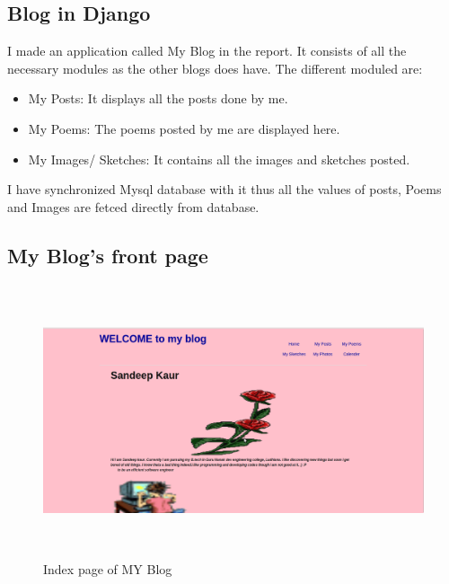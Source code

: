 
\subsection{Blog in Django}
I made an application called My Blog in the report. It consists of all the necessary modules as the other blogs does have.
The different moduled are:
\begin{itemize}
\item My Posts: It displays all the posts done by me.
\item My Poems: The poems posted by me are displayed here.
\item My Images/ Sketches: It contains all the images and sketches posted.
\end{itemize}
 
I have synchronized Mysql database with it thus all the values of posts, Poems and Images are fetced directly from database.
\subsection{My Blog's front page}
\begin{figure}[h]
\centering \includegraphics[height=8cm]{bg.png}
\caption{Index page of MY Blog}
\end{figure}

